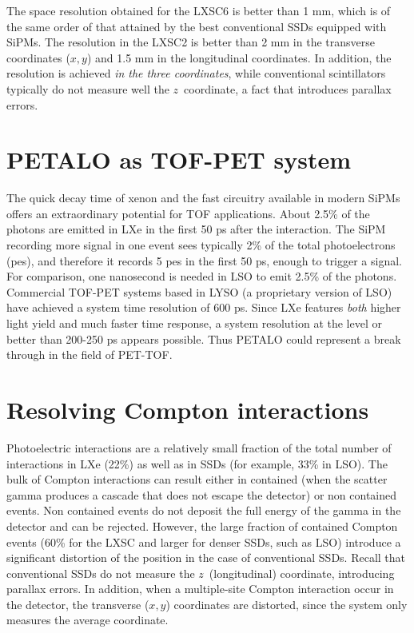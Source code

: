 \documentclass[a4paper,11pt,oneside]{article}
\begin{document}
The space resolution obtained for the LXSC6 is better than 1 mm, which is of the same order of that attained by the best conventional SSDs equipped with SiPMs. The resolution in the LXSC2 is better than 2 mm in the transverse coordinates ($x,y$) and 1.5 mm in the longitudinal coordinates.  In addition, the resolution is achieved {\em in the three coordinates}, while conventional scintillators typically do not measure well the $z$~coordinate, a fact that introduces parallax errors. 



\section{PETALO as TOF-PET system}
\label{sec.tof}


The quick decay time of xenon and the fast circuitry available in modern SiPMs offers an extraordinary potential for TOF applications. About 2.5\% of the photons are emitted in LXe in the first 50 ps after the interaction. The SiPM recording more signal in one event sees typically  2\% of the total photoelectrons (pes), and therefore it records 5 pes in the first 50 ps, enough to trigger a signal. For comparison, one nanosecond is needed in LSO to emit 2.5\% of the photons. Commercial TOF-PET systems based in LYSO (a proprietary version of LSO) have achieved a system time resolution of 600 ps. Since LXe features {\em both} higher light yield and much faster time response, a system resolution at the level or better than 200-250 ps appears possible. Thus PETALO could represent a break through in the field of PET-TOF. 

\section{Resolving Compton interactions}
\label{sec.comp}

Photoelectric interactions are a relatively small fraction of the total number of interactions in LXe (22\%) as well as in SSDs (for example, 33\% in LSO). The bulk of Compton interactions can result either in contained (when the scatter gamma produces a cascade that does not escape the detector) or non contained events. Non contained events do not deposit the full energy of the gamma in the detector and can be rejected. However, the large fraction of contained Compton events (60\% for the LXSC and larger for denser SSDs, such as LSO) introduce a significant distortion of the position in the case of conventional SSDs. Recall that conventional SSDs do not measure the $z$~(longitudinal) coordinate, introducing parallax errors. In addition, when a multiple-site Compton interaction occur in the detector, the transverse ($x,y$) coordinates are distorted, since the system only measures the average coordinate. 
\end{document}
